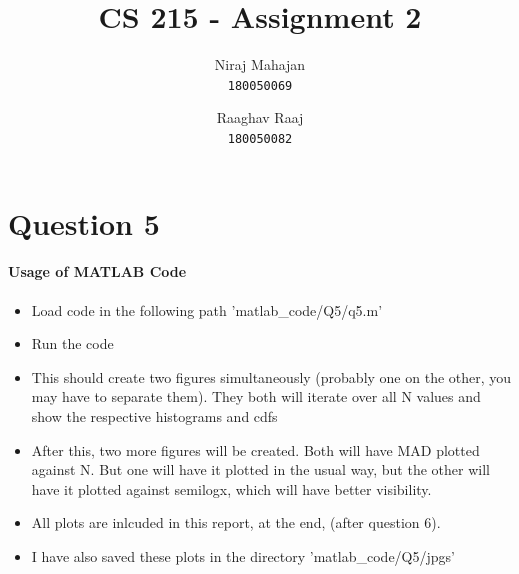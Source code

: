 \documentclass[12pt]{article}
\author{
Niraj Mahajan \\
\texttt{180050069} \and
Raaghav Raaj \\
\texttt{180050082}}
\title{CS 215 - Assignment 2}
\begin{document}
\maketitle

\newpage
\section{Question 5}



\paragraph{Usage of MATLAB Code}
\begin{itemize}
\item Load code in the following path 'matlab\_code/Q5/q5.m'
\item Run the code
\item This should create two figures simultaneously (probably one on the other, you may have to separate them). They both will iterate over all N values and show the respective histograms and cdfs
\item After this, two more figures will be created. Both will have MAD plotted against N. But one will have it plotted in the usual way, but the other will have it plotted against semilogx, which will have better visibility.
\item All plots are inlcuded in this report, at the end, (after question 6).
\item I have also saved these plots in the directory 'matlab\_code/Q5/jpgs'
\end{itemize}
\end{document}
